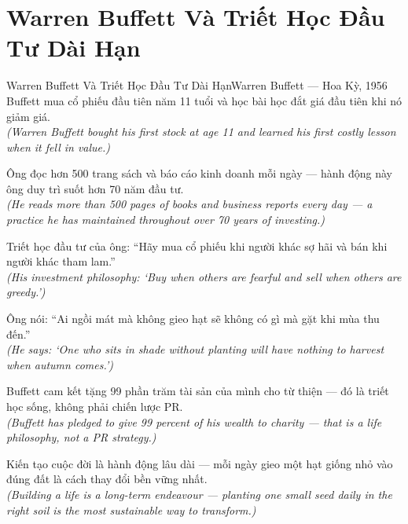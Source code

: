 \section{Warren Buffett Và Triết Học Đầu Tư Dài Hạn}
\begin{truyen}{Warren Buffett Và Triết Học Đầu Tư Dài Hạn}{Warren Buffett --- Hoa Kỳ, 1956}
 Buffett mua cổ phiếu đầu tiên năm 11 tuổi và học bài học đắt giá đầu tiên khi nó giảm giá.\\[4pt]
\textit{(Warren Buffett bought his first stock at age 11 and learned his first costly lesson when it fell in value.)}

Ông đọc hơn 500 trang sách và báo cáo kinh doanh mỗi ngày --- hành động này ông duy trì suốt hơn 70 năm đầu tư.\\[4pt]
\textit{(He reads more than 500 pages of books and business reports every day --- a practice he has maintained throughout over 70 years of investing.)}

Triết học đầu tư của ông: ``Hãy mua cổ phiếu khi người khác sợ hãi và bán khi người khác tham lam.''\\[4pt]
\textit{(His investment philosophy: `Buy when others are fearful and sell when others are greedy.')}

Ông nói: ``Ai ngồi mát mà không gieo hạt sẽ không có gì mà gặt khi mùa thu đến.''\\[4pt]
\textit{(He says: `One who sits in shade without planting will have nothing to harvest when autumn comes.')}

Buffett cam kết tặng 99 phần trăm tài sản của mình cho từ thiện --- đó là triết học sống, không phải chiến lược PR.\\[4pt]
\textit{(Buffett has pledged to give 99 percent of his wealth to charity --- that is a life philosophy, not a PR strategy.)}

\end{truyen}
\begin{baihoc}
  Kiến tạo cuộc đời là hành động lâu dài --- mỗi ngày gieo một hạt giống nhỏ vào đúng đất là cách thay đổi bền vững nhất.\\[4pt]
  \textit{(Building a life is a long-term endeavour --- planting one small seed daily in the right soil is the most sustainable way to transform.)}
\end{baihoc}


